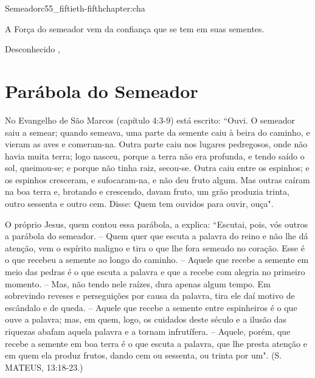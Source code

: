 \begin{chapterpage}{Semeador}{c55_fiftieth-fifthchapter:cha}
 
\begin{myquotation}A Força do semeador vem da confiança que se tem em suas sementes.
\par\vspace*{15mm}
\mbox{}\hfill \emdash{}Desconhecido
, %
\par\end{myquotation}

\end{chapterpage}



\section{Parábola do Semeador}\label{c1_basicformatting:sec}

\emdash{}No Evangelho de São Marcos (capítulo 4:3-9) está escrito: ``Ouvi. O semeador saiu a semear; quando semeava, uma parte da semente caiu à beira do caminho, e vieram as aves e comeram-na. Outra parte caiu nos lugares pedregosos, onde não havia muita terra; logo nasceu, porque a terra não era profunda, e tendo saído o sol, queimou-se; e porque não tinha raiz, secou-se. Outra caiu entre os espinhos; e os espinhos cresceram, e sufocaram-na, e não deu fruto algum. Mas outras caíram na boa terra e, brotando e crescendo, davam fruto, um grão produzia trinta, outro sessenta e outro cem. Disse: Quem tem ouvidos para ouvir, ouça".

\emdash{}O próprio Jesus, quem contou essa parábola, a explica: ``Escutai, pois, vós outros a parábola do semeador. – Quem quer que escuta a palavra do reino e não lhe dá atenção, vem o espírito maligno e tira o que lhe fora semeado no coração. Esse é o que recebeu a semente ao longo do caminho. – Aquele que recebe a semente em meio das pedras é o que escuta a palavra e que a recebe com alegria no primeiro momento. – Mas, não tendo nele raízes, dura apenas algum tempo. Em sobrevindo reveses e perseguições por causa da palavra, tira ele daí motivo de escândalo e de queda. – Aquele que recebe a semente entre espinheiros é o que ouve a palavra; mas, em quem, logo, os cuidados deste século e a ilusão das riquezas abafam aquela palavra e a tornam infrutífera. – Aquele, porém, que recebe a semente em boa terra é o que escuta a palavra, que lhe presta atenção e em quem ela produz frutos, dando cem ou sessenta, ou trinta por um". (S. MATEUS, 13:18-23.)

